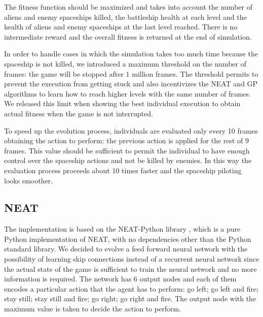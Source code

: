 The fitness function should be maximized and takes into account the number of aliens and
enemy spaceships killed, the battleship health at each level and the health of aliens and
enemy spaceships at the last level reached. There is no intermediate reward and the overall
fitness is returned at the end of simulation.

In order to handle cases in which the simulation takes too much time because the spaceship
is not killed, we introduced a maximum threshold on the number of frames: the game will be
stopped after $1$ million frames. The threshold permits to prevent the execution from getting
stuck and also incentivizes the NEAT and GP algorithms to learn how to reach higher levels
with the same number of frames. We released this limit when showing the best individual
execution to obtain actual fitness when the game is not interrupted.

To speed up the evolution process, individuals are evaluated only every 10 frames obtaining
the action to perform: the previous action is applied for the rest of 9 frames. This value
should be sufficient to permit the individual to have enough control over the spaceship
actions and not be killed by enemies. In this way the evaluation process proceeds about 10
times faster and the spaceship piloting looks smoother.

\subsection{NEAT}
The implementation is based on the NEAT-Python library \cite{NEAT-Python}, which is a pure Python
implementation of NEAT, with no dependencies other than the Python standard library.
We decided to evolve a feed forward neural network with the possibility of learning skip
connections instead of a recurrent neural network since the actual state of the game is
sufficient to train the neural network and no more information is required. The network has 6
output nodes and each of them encodes a particular action that the agent has to perform:
go left; go left and fire; stay still; stay still and fire; go right; go right and fire.
The output node with the maximum value is taken to decide the action to perform.

